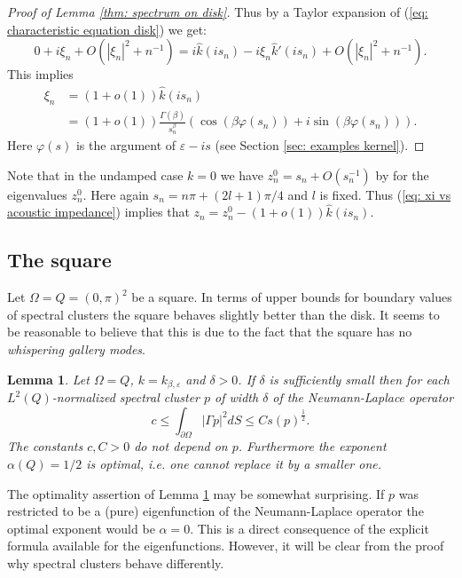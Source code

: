 \documentclass{amsart}
\newcommand{\abs}[1]{\left|#1\right|}
\newcommand{\khat}{\hat{k}}
\newtheorem{Lemma}[Theorem]{Lemma}
\begin{document}
\begin{proof}[Proof of Lemma \ref{thm: spectrum on disk}]
 Thus by a Taylor expansion of (\ref{eq: characteristic equation disk}) we get:
 \begin{equation}\nonumber
  0 + i\xi_n + O(\abs{\xi_n}^2+n^{-1}) = i\khat(is_n) - i\xi_n\khat'(is_n) + O(\abs{\xi_n}^2+n^{-1}) .
 \end{equation}
 This implies
 \begin{align}\label{eq: xi vs acoustic impedance}
  \xi_n &= (1+o(1))\khat(is_n) \\ \nonumber
  &= (1+o(1))\frac{\Gamma(\beta)}{s_n^{\beta}}\left(\cos(\beta\varphi(s_n)) + i\sin(\beta\varphi(s_n))\right).
 \end{align}
 Here $\varphi(s)$ is the argument of $\varepsilon-is$ (see Section \ref{sec: examples kernel}).
\end{proof}
Note that in the undamped case $k=0$ we have $z_n^{0}=s_n+O(s_n^{-1})$ by \cite[Formula 9.5.12]{AbramowitzStegun} for the eigenvalues $z_n^0$. Here again $s_n=n\pi + (2l+1)\pi/4$ and $l$ is fixed. Thus (\ref{eq: xi vs acoustic impedance}) implies that $z_n=z_n^0-(1+o(1))\khat(is_n)$.

\subsection{The square}
Let $\Omega=Q=(0,\pi)^2$ be a square. In terms of upper bounds for boundary values of spectral clusters the square behaves slightly better than the disk. It seems to be reasonable to believe that this is due to the fact that the square has no \emph{whispering gallery modes}.
\begin{Lemma}\label{thm: upper bound for square}
 Let $\Omega=Q$, $k=k_{\beta,\varepsilon}$ and $\delta>0$. If $\delta$ is sufficiently small then for each $L^2(Q)$-normalized spectral cluster $p$ of width $\delta$ of the Neumann-Laplace operator
 \begin{equation}\nonumber
  c \leq \int_{\partial\Omega} |\Gamma p|^2 dS \leq C s(p)^{\frac{1}{2}}.
 \end{equation}
 The constants $c,C>0$ do not depend on $p$. Furthermore the exponent $\alpha(Q)=1/2$ is optimal, i.e. one cannot replace it by a smaller one. 
\end{Lemma}
The optimality assertion of Lemma \ref{thm: upper bound for square} may be somewhat surprising. If $p$ was restricted to be a (pure) eigenfunction of the Neumann-Laplace operator the optimal exponent would be $\alpha=0$. This is a direct consequence of the explicit formula available for the eigenfunctions. However, it will be clear from the proof why spectral clusters behave differently.
\end{document}
